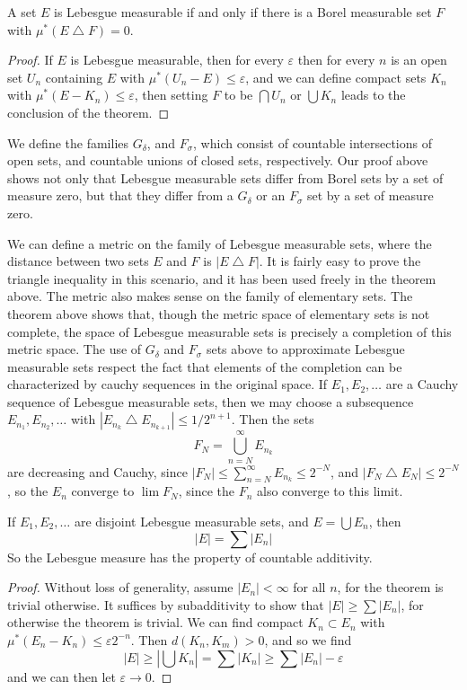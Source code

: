 \begin{theorem}
  A set $E$ is Lebesgue measurable if and only if there is a Borel measurable set $F$ with $\mu^*(E \bigtriangleup F) = 0$.
\end{theorem}
\begin{proof}
  If $E$ is Lebesgue measurable, then for every $\varepsilon$ then for every $n$ is an open set $U_n$ containing $E$ with $\mu^*(U_n - E) \leq \varepsilon$, and we can define compact sets $K_n$ with $\mu^*(E - K_n) \leq \varepsilon$, then setting $F$ to be $\bigcap U_n$ or $\bigcup K_n$ leads to the conclusion of the theorem.
\end{proof}

We define the families $G_\delta$, and $F_\sigma$, which consist of countable intersections of open sets, and countable unions of closed sets, respectively. Our proof above shows not only that Lebesgue measurable sets differ from Borel sets by a set of measure zero, but that they differ from a $G_\delta$ or an $F_\sigma$ set by a set of measure zero.

\begin{remark}
  We can define a metric on the family of Lebesgue measurable sets, where the distance between two sets $E$ and $F$ is $|E \bigtriangleup F|$. It is fairly easy to prove the triangle inequality in this scenario, and it has been used freely in the theorem above. The metric also makes sense on the family of elementary sets. The theorem above shows that, though the metric space of elementary sets is not complete, the space of Lebesgue measurable sets is precisely a completion of this metric space. The use of $G_\delta$ and $F_\sigma$ sets above to approximate Lebesgue measurable sets respect the fact that elements of the completion can be characterized by cauchy sequences in the original space. If $E_1, E_2, \dots$ are a Cauchy sequence of Lebesgue measurable sets, then we may choose a subsequence $E_{n_1}, E_{n_2}, \dots$ with $|E_{n_k} \bigtriangleup E_{n_{k+1}}| \leq 1/2^{n+1}$. Then the sets
  \[ F_N = \bigcup_{n = N}^\infty E_{n_k} \]
  are decreasing and Cauchy, since $|F_N| \leq \sum_{n = N}^\infty E_{n_k} \leq 2^{-N}$, and $|F_N \bigtriangleup E_N| \leq 2^{-N}$, so the $E_n$ converge to $\lim F_N$, since the $F_n$ also converge to this limit.
\end{remark}

\begin{theorem}
  If $E_1, E_2, \dots$ are disjoint Lebesgue measurable sets, and $E = \bigcup E_n$, then
  \[ \left| E \right| = \sum |E_n| \]
  So the Lebesgue measure has the property of countable additivity.
\end{theorem}
\begin{proof}
  Without loss of generality, assume $|E_n| < \infty$ for all $n$, for the theorem is trivial otherwise. It suffices by subadditivity to show that $|E| \geq \sum |E_n|$, for otherwise the theorem is trivial. We can find compact $K_n \subset E_n$ with $\mu^*(E_n - K_n) \leq \varepsilon 2^{-n}$. Then $d(K_n,K_m) > 0$, and so we find
  \[ |E| \geq \left| \bigcup K_n \right| = \sum |K_n| \geq \sum |E_n| - \varepsilon \]
  and we can then let $\varepsilon \to 0$.
\end{proof}

